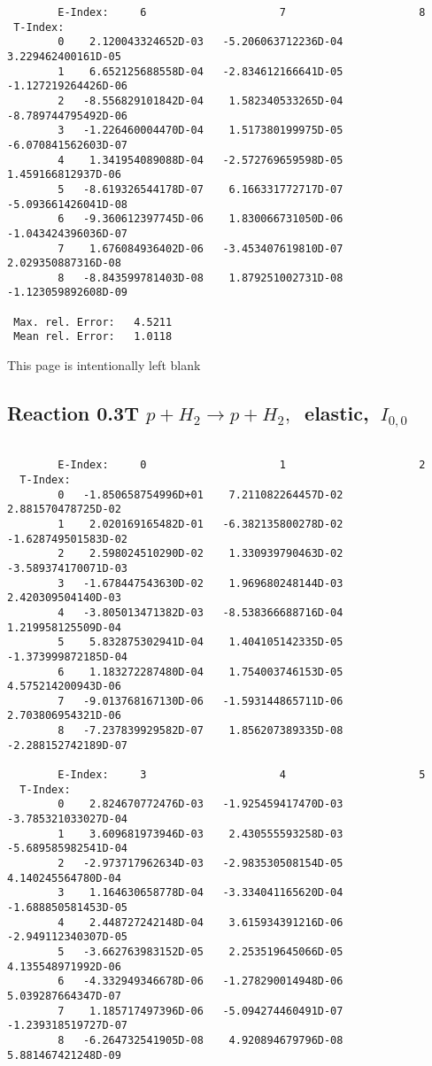 \documentclass[12pt,dvipdfmx]{article}
\begin{document}
{\begin{small}
\begin{verbatim}
        E-Index:     6                     7                     8
 T-Index:
        0    2.120043324652D-03   -5.206063712236D-04    3.229462400161D-05
        1    6.652125688558D-04   -2.834612166641D-05   -1.127219264426D-06
        2   -8.556829101842D-04    1.582340533265D-04   -8.789744795492D-06
        3   -1.226460004470D-04    1.517380199975D-05   -6.070841562603D-07
        4    1.341954089088D-04   -2.572769659598D-05    1.459166812937D-06
        5   -8.619326544178D-07    6.166331772717D-07   -5.093661426041D-08
        6   -9.360612397745D-06    1.830066731050D-06   -1.043424396036D-07
        7    1.676084936402D-06   -3.453407619810D-07    2.029350887316D-08
        8   -8.843599781403D-08    1.879251002731D-08   -1.123059892608D-09

 Max. rel. Error:   4.5211
 Mean rel. Error:   1.0118
\end{verbatim}\end{small}

\newpage
This page is intentionally left blank
\newpage


\subsection{
Reaction 0.3T  $p + H_2 \rightarrow  p + H_2 ,\ $  elastic,
$\  I_{0,0}$
}

\begin{small}\begin{verbatim}

        E-Index:     0                     1                     2
  T-Index:
        0   -1.850658754996D+01    7.211082264457D-02    2.881570478725D-02
        1    2.020169165482D-01   -6.382135800278D-02   -1.628749501583D-02
        2    2.598024510290D-02    1.330939790463D-02   -3.589374170071D-03
        3   -1.678447543630D-02    1.969680248144D-03    2.420309504140D-03
        4   -3.805013471382D-03   -8.538366688716D-04    1.219958125509D-04
        5    5.832875302941D-04    1.404105142335D-05   -1.373999872185D-04
        6    1.183272287480D-04    1.754003746153D-05    4.575214200943D-06
        7   -9.013768167130D-06   -1.593144865711D-06    2.703806954321D-06
        8   -7.237839929582D-07    1.856207389335D-08   -2.288152742189D-07

        E-Index:     3                     4                     5
  T-Index:
        0    2.824670772476D-03   -1.925459417470D-03   -3.785321033027D-04
        1    3.609681973946D-03    2.430555593258D-03   -5.689585982541D-04
        2   -2.973717962634D-03   -2.983530508154D-05    4.140245564780D-04
        3    1.164630658778D-04   -3.334041165620D-04   -1.688850581453D-05
        4    2.448727242148D-04    3.615934391216D-06   -2.949112340307D-05
        5   -3.662763983152D-05    2.253519645066D-05    4.135548971992D-06
        6   -4.332949346678D-06   -1.278290014948D-06    5.039287664347D-07
        7    1.185717497396D-06   -5.094274460491D-07   -1.239318519727D-07
        8   -6.264732541905D-08    4.920894679796D-08    5.881467421248D-09


\end{verbatim}
\end{small}}
\end{document}
